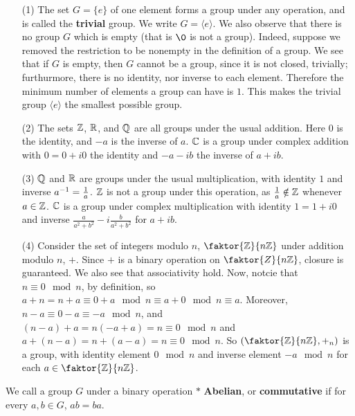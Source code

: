 \begin{example}\label{example_1.2}
  \begin{enumerate}
    \item[(1)] The set $G=\{e\}$ of one element forms a group under any
      operation, and is called the \textbf{trivial} group. We write
      $G=\langle e \rangle$. We also observe that there is no group $G$ which
      is empty (that is $\0$ is not a group). Indeed, suppose we removed
      the restriction to be nonempty in the definition of a group. We see
      that if $G$ is empty, then  $G$ cannot be a group, since it is
      not closed, trivially; furthurmore, there is no identity, nor inverse
      to each element. Therefore the minimum number of elements a group can
      have is $1$. This makes the trivial group $\langle e \rangle$
      the smallest possible group.

    \item[(2)] The sets $\mathbb{Z}$,  $\mathbb{R}$, and  $\mathbb{Q}$ are all groups under the
      usual addition. Here $0$ is the identity, and  $-a$ is the inverse
      of  $a$.  $\mathbb{C}$ is a group under complex addition with $0=0+i0$ the
      identity and $-a-ib$ the inverse of $a+ib$.

    \item[(3)] $\mathbb{Q}$ and  $\mathbb{R}$ are groups under the usual multiplication,
      with identity  $1$ and inverse  $a^{-1}=\frac{1}{a}$. $\mathbb{Z}$ is not a
      group under this operation, as  $\frac{1}{a} \notin \mathbb{Z}$ whenever $a
      \in \mathbb{Z}$.  $\mathbb{C}$ is a group under complex multiplication with identity
      $1=1+i0$ and inverse $\frac{a}{a^2+b^2}-i\frac{b}{a^2+b^2}$ for
      $a+ib$.

    \item[(4)] Consider the set of integers modulo $n$, $\faktor{\Z}{n\Z}$
      under addition modulo $n$, $+$. Since  $+$ is a binary operation on
      $\faktor{Z}{n\Z}$, closure is guaranteed. We also see that
      associativity hold. Now, notcie that $n \equiv 0 \mod{n}$, by
      definition, so $a+n=n+a \equiv 0+a \mod{n} \equiv a+0 \mod{n}
      \equiv a$. Moreover, $n-a \equiv 0-a \equiv -a \mod{n}$, and
      $(n-a)+a=n(-a+a)=n \equiv 0 \mod{n}$ and $a+(n-a)=n+(a-a)=n \equiv
      0 \mod{n}$. So $(\faktor{\Z}{n\Z}, +_n)$ is a group, with identity
      element $0 \mod{n}$ and inverse element $-a \mod{n}$ for each $a
      \in \faktor{\Z}{n\Z}$.
  \end{enumerate}
\end{example}

\begin{definition}
  We call a group $G$ under a binary operation  $\ast$  \textbf{Abelian}, or
  \textbf{commutative} if for every $a,b \in G$,  $ab=ba$.
\end{definition}

